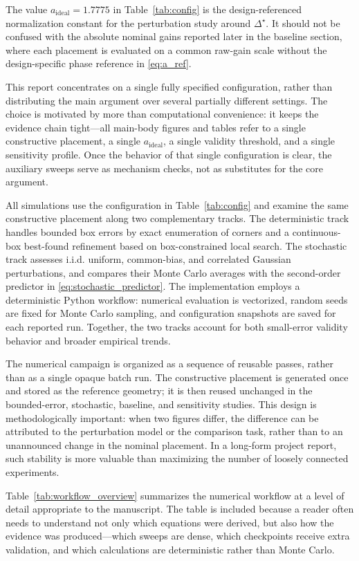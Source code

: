 The value $a_{\mathrm{ideal}} = 1.7775$ in Table~\ref{tab:config} is the design-referenced normalization constant for the perturbation study around $\Delta^\star$. It should not be confused with the absolute nominal gains reported later in the baseline section, where each placement is evaluated on a common raw-gain scale without the design-specific phase reference in \eqref{eq:a_ref}.

This report concentrates on a single fully specified configuration, rather than distributing the main argument over several partially different settings. The choice is motivated by more than computational convenience: it keeps the evidence chain tight—all main-body figures and tables refer to a single constructive placement, a single $a_{\mathrm{ideal}}$, a single validity threshold, and a single sensitivity profile. Once the behavior of that single configuration is clear, the auxiliary sweeps serve as mechanism checks, not as substitutes for the core argument.

All simulations use the configuration in Table~\ref{tab:config} and examine the same constructive placement along two complementary tracks. The deterministic track handles bounded box errors by exact enumeration of corners and a continuous-box best-found refinement based on box-constrained local search. The stochastic track assesses i.i.d. uniform, common-bias, and correlated Gaussian perturbations, and compares their Monte Carlo averages with the second-order predictor in \eqref{eq:stochastic_predictor}. The implementation employs a deterministic Python workflow: numerical evaluation is vectorized, random seeds are fixed for Monte Carlo sampling, and configuration snapshots are saved for each reported run. Together, the two tracks account for both small-error validity behavior and broader empirical trends.

The numerical campaign is organized as a sequence of reusable passes, rather than as a single opaque batch run. The constructive placement is generated once and stored as the reference geometry; it is then reused unchanged in the bounded-error, stochastic, baseline, and sensitivity studies. This design is methodologically important: when two figures differ, the difference can be attributed to the perturbation model or the comparison task, rather than to an unannounced change in the nominal placement. In a long-form project report, such stability is more valuable than maximizing the number of loosely connected experiments.

Table~\ref{tab:workflow_overview} summarizes the numerical workflow at a level of detail appropriate to the manuscript. The table is included because a reader often needs to understand not only which equations were derived, but also how the evidence was produced—which sweeps are dense, which checkpoints receive extra validation, and which calculations are deterministic rather than Monte Carlo.


